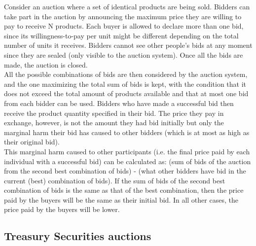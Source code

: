 \documentclass[a4paper]{article}
\begin{document}
Consider an auction where a set of identical products are being sold. Bidders can take part in the auction by announcing the maximum price they are willing to pay to receive N products. Each buyer is allowed to declare more than one bid, since its willingness-to-pay per unit might be different depending on the total number of units it receives. Bidders cannot see other people's bids at any moment since they are sealed (only visible to the auction system). Once all the bids are made, the auction is closed.
\\
All the possible combinations of bids are then considered by the auction system, and the one maximizing the total sum of bids is kept, with the condition that it does not exceed the total amount of products available and that at most one bid from each bidder can be used. Bidders who have made a successful bid then receive the product quantity specified in their bid. The price they pay in exchange, however, is not the amount they had bid initially but only the marginal harm their bid has caused to other bidders (which is at most as high as their original bid).
\\
This marginal harm caused to other participants (i.e. the final price paid by each individual with a successful bid) can be calculated as: (sum of bids of the auction from the second best combination of bids) - (what other bidders have bid in the current (best) combination of bids). If the sum of bids of the second best combination of bids is the same as that of the best combination, then the price paid by the buyers will be the same as their initial bid. In all other cases, the price paid by the buyers will be lower.

\subsection*{Treasury Securities auctions}
\end{document}
